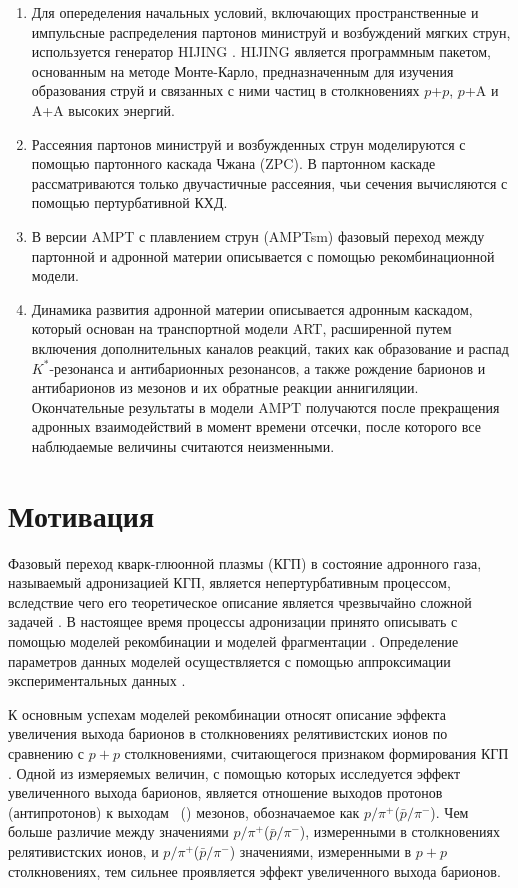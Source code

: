 \begin{enumerate}
\item Для опеределения начальных условий, включающих пространственные и импульсные распределения партонов министруй и возбуждений мягких струн, используется генератор HIJING \cite{HIJING}. HIJING является программным пакетом, основанным на методе Монте-Карло, предназначенным для изучения образования струй и связанных с ними частиц в столкновениях $p$+$p$, $p$+A и A+A высоких энергий.
 
\item Рассеяния партонов министруй и возбужденных струн моделируются с помощью партонного каскада Чжана (ZPC). В партонном каскаде рассматриваются только двучастичные рассеяния, чьи сечения вычисляются с помощью пертурбативной КХД. 

\item В версии AMPT с плавлением струн (AMPTsm) фазовый переход между партонной и адронной материи описывается с помощью рекомбинационной модели. 

\item Динамика развития адронной материи описывается адронным каскадом, который основан на транспортной модели ART, расширенной путем включения дополнительных каналов реакций, таких как образование и распад $K^*$-резонанса и антибарионных резонансов, а также рождение барионов и антибарионов из мезонов и их обратные реакции аннигиляции. 
Окончательные результаты в модели AMPT получаются после прекращения адронных взаимодействий в момент времени отсечки, после которого все наблюдаемые величины считаются неизменными.  
\end{enumerate}


\section{Мотивация}
Фазовый переход кварк-глюонной плазмы (КГП) \cite{QGP} в состояние адронного газа, называемый адронизацией КГП, является непертурбативным процессом, вследствие чего его теоретическое описание является чрезвычайно сложной задачей \cite{Coalescence_models}. В настоящее время процессы адронизации принято описывать с помощью моделей рекомбинации \cite{Coalescence_models, Recombination1, Recombination2} и моделей фрагментации \cite{FragmentationLund}. Определение параметров данных моделей осуществляется с помощью аппроксимации экспериментальных данных \cite{Coalescence_models, AMPT}. 

К основным успехам моделей рекомбинации относят описание эффекта увеличения выхода барионов в столкновениях релятивистских ионов по сравнению с $p+p$ столкновениями, считающегося признаком формирования КГП \cite{p2piRatio_130GeV, p2piRatio_2003}. Одной из измеряемых величин, с помощью которых исследуется эффект увеличенного выхода барионов, является отношение выходов протонов (антипротонов) к выходам  \pip \ (\pim) мезонов, обозначаемое как  $p/\pi^{+}$($\bar{p}/\pi^{-}$). Чем больше различие между значениями $p/\pi^{+}$($\bar{p}/\pi^{-}$), измеренными в столкновениях релятивистских ионов, и  $p/\pi^{+}$($\bar{p}/\pi^{-}$) значениями, измеренными в $p+p$ столкновениях, тем сильнее проявляется эффект увеличенного выхода барионов. 

